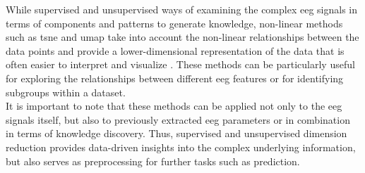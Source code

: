 While supervised and unsupervised ways of examining the complex \gls{eeg} signals in terms of components and patterns to generate knowledge, non-linear methods such as \gls{tsne} and \gls{umap} take into account the non-linear relationships between the data points and provide a lower-dimensional representation of the data that is often easier to interpret and visualize \cite{mcinnes2018umap}. These methods can be particularly useful for exploring the relationships between different \gls{eeg} features or for identifying subgroups within a dataset.\\
It is important to note that these methods can be applied not only to the \gls{eeg} signals itself, but also to previously extracted \gls{eeg} parameters or in combination in terms of knowledge discovery. Thus, supervised and unsupervised dimension reduction provides data-driven insights into the complex underlying information, but also serves as preprocessing for further tasks such as prediction.


